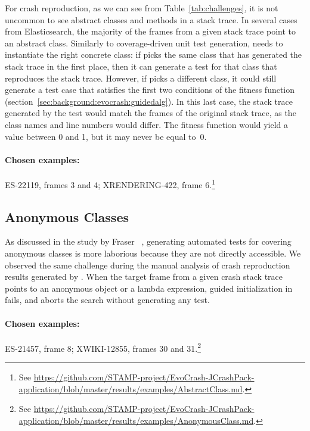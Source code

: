 For crash reproduction, as we can see from Table~\ref{tab:challenges}, it is not uncommon to see abstract classes and methods in a stack trace. 
In several cases from Elasticsearch, the majority of the frames from a given stack trace point to an abstract class.
Similarly to coverage-driven unit test generation, \evocrash needs to instantiate the right concrete class: if \evocrash picks the same class that has generated the stack trace in the first place, then it can generate a test for that class that reproduces the stack trace. 
However, if \evocrash picks a different class, it could still generate a test case that satisfies the first two conditions of the fitness function (section~\ref{sec:background:evocrash:guidedalg}). 
In this last case, the stack trace generated by the test would match the frames of the original stack trace, as the class names and line numbers would differ.
The fitness function would yield a value between 0 and 1, but it may never be equal to~0.

\paragraph{Chosen examples:} 
ES-22119, frames 3 and 4;
XRENDERING-422, frame 6.\footnote{See \url{https://github.com/STAMP-project/EvoCrash-JCrashPack-application/blob/master/results/examples/AbstractClass.md}.}


\subsection{Anonymous Classes}

As discussed in the study by Fraser \etal~\cite{fraser2012whole}, generating automated tests for covering anonymous classes is more laborious because they are not directly accessible. 
We observed the same challenge during the manual analysis of crash reproduction results generated by \evocrash.
When the target frame from a given crash stack trace points to an anonymous object or a lambda expression, guided initialization in \evocrash fails, and \evocrash aborts the search without generating any test.

\paragraph{Chosen examples:} 
ES-21457, frame 8;
XWIKI-12855, frames 30 and 31.\footnote{See \url{https://github.com/STAMP-project/EvoCrash-JCrashPack-application/blob/master/results/examples/AnonymousClass.md}.}


